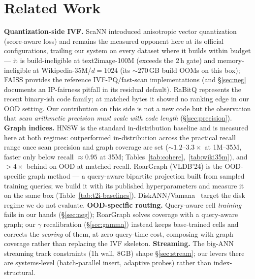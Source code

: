 \documentclass{article}
\begin{document}
\section{Related Work}
\label{sec:rel}
\textbf{Quantization-side IVF.} ScaNN introduced anisotropic vector quantization
(score-aware loss) and remains the measured opponent here at its official
configurations, trailing our system on every dataset where it builds within budget
--- it is build-ineligible at text2image-100M (exceeds the 2\,h gate) and
memory-ineligible at Wikipedia-35M/$d{=}1024$ (its ${\sim}270$\,GB build OOMs on this
box); FAISS provides the reference IVF-PQ/fast-scan implementations
(and \S\ref{sec:neg} documents an IP-fairness pitfall in its residual default).
RaBitQ represents the recent binary-ish code family; at matched bytes it showed
no ranking edge in our OOD setting. Our contribution on this side is not a new
code but the observation that \emph{scan arithmetic precision must scale with
code length} (\S\ref{sec:precision}).
\textbf{Graph indices.} HNSW is the standard in-distribution baseline and is
measured here at both regimes: outperformed in-distribution across the
practical recall range once scan precision and graph coverage are set
(${\sim}1.2$--$3.3\times$ at 1M--35M, faster only below recall ${\approx}0.95$
at 35M; Tables~\ref{tab:cohere},~\ref{tab:wiki35m}), and
$>\!4\times$ behind on OOD at matched recall. RoarGraph (VLDB'24) is the
OOD-specific graph method --- a query-aware bipartite projection built from
sampled training queries; we build it with its published hyperparameters and
measure it on the same box (Table~\ref{tab:t2i-baselines}). DiskANN/Vamana~\cite{diskann}
target the disk regime we do not evaluate.
\textbf{OOD-specific routing.} Query-aware cell \emph{training} fails in our
hands (\S\ref{sec:neg}); RoarGraph solves coverage with a query-aware graph;
our $\gamma$ recalibration (\S\ref{sec:gamma}) instead keeps base-trained cells
and corrects the \emph{scoring} of them, at zero query-time cost, composing with
graph coverage rather than replacing the IVF skeleton.
\textbf{Streaming.} The big-ANN streaming track constraints (1h wall, 8GB) shape
\S\ref{sec:stream}; our levers there are systems-level (batch-parallel insert,
adaptive probes) rather than index-structural.
\end{document}
